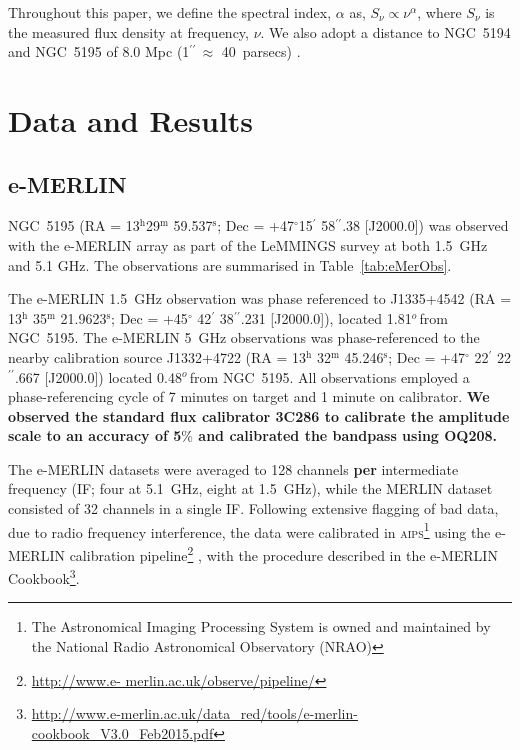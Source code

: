 \documentclass[fleqn,usenatbib]{mnras}
\def\Tab{Table}
\def\deg{$^{o}\,$}
\def\arcs{$^{\prime\prime}\,$}
\begin{document}
Throughout this paper, we define the spectral index, $\alpha$ as, $S_{\nu} \propto \nu^{\alpha}$, where $S_{\nu}$ is the measured flux density at frequency, $\nu$. We also adopt a distance to NGC~5194 and NGC~5195 of  8.0 Mpc (1\arcs $\approx$ 40~parsecs) \citep{SJMV}.


\section{Data and Results}
\label{sec:obs}

\subsection{e-MERLIN}

NGC~5195 (RA = 13$^{\mathrm{h}}$29$^{\mathrm{m}}$ 59.537$^{\mathrm{s}}$; Dec = +47$^{\circ}$15$^{\prime}$ 58$^{\prime\prime}$.38 [J2000.0]) was observed with the e-MERLIN array as part of the LeMMINGS survey at both 1.5~GHz and 5.1 GHz. The observations are summarised in \Tab~\ref{tab:eMerObs}. 

The e-MERLIN 1.5~GHz observation was phase referenced to J1335+4542 (RA = 13$^{\mathrm{h}}$ 35$^{\mathrm{m}}$ 
21.9623$^{\mathrm{s}}$; Dec = +45$^{\circ}$ 42$^{\prime}$ 38$^{\prime\prime}$.231 [J2000.0]), located 1.81\deg from NGC~5195.
The e-MERLIN 5~GHz observations was phase-referenced to the nearby calibration source J1332+4722 (RA = 13$^{\mathrm{h}}$ 32$^{\mathrm{m}}$ 45.246$^{\mathrm{s}}$; Dec = +47$^{\circ}$ 22$^{\prime}$ 22$^{\prime\prime}$.667 [J2000.0]) located 0.48\deg from NGC~5195. All observations employed a phase-referencing cycle of 7 minutes on target and 1 minute on calibrator. \textbf{We observed the standard flux	calibrator 3C286 to	calibrate the amplitude scale to an accuracy of 5$\%$ and calibrated the bandpass using OQ208. }

The e-MERLIN datasets were averaged to 128 channels \textbf{per} intermediate frequency (IF; four at 5.1~GHz, eight at 1.5~GHz), while the MERLIN dataset consisted of 32 channels in a single IF. Following extensive flagging of bad data, due to radio frequency interference, the data were calibrated in 
\textsc{aips}\footnote{The Astronomical Imaging Processing System is owned and maintained by the National Radio  
Astronomical  Observatory  (NRAO)} using the e-MERLIN calibration pipeline\footnote{\url{http://www.e-
merlin.ac.uk/observe/pipeline/}} \citep{Argo2014}, with the procedure described in the e-MERLIN 
Cookbook\footnote{\url{http://www.e-merlin.ac.uk/data_red/tools/e-merlin-cookbook_V3.0_Feb2015.pdf}}. 
\end{document}
